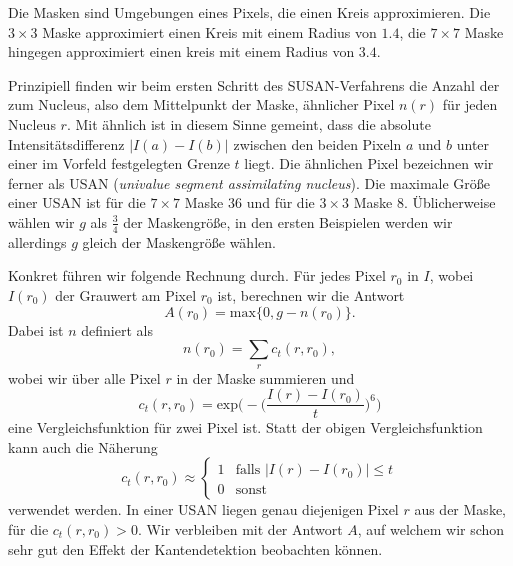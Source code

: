 \documentclass[a4paper, 11pt]{report}
\renewcommand{\emph}[1]{\textit{#1}}
\theoremstyle{definition}
\begin{document}
			Die Masken sind Umgebungen eines Pixels, die einen Kreis approximieren. Die $3 \times 3$ Maske approximiert einen Kreis mit einem Radius von $1.4$, die $7 \times 7$ Maske hingegen approximiert einen kreis mit einem Radius von $3.4$.

			Prinzipiell finden wir beim ersten Schritt des SUSAN-Verfahrens die Anzahl der zum Nucleus, also dem Mittelpunkt der Maske, ähnlicher Pixel $n(r)$ für jeden Nucleus $r$. Mit \glqq ähnlich\grqq{} ist in diesem Sinne gemeint, dass die absolute Intensitätsdifferenz $|I(a)-I(b)|$ zwischen den beiden Pixeln $a$ und $b$ unter einer im Vorfeld festgelegten Grenze $t$ liegt. Die ähnlichen Pixel bezeichnen wir ferner als USAN (\emph{univalue segment assimilating nucleus}). Die maximale Größe einer USAN ist für die $7 \times 7$ Maske $36$ und für die $3 \times 3$ Maske $8$. Üblicherweise wählen wir $g$ als $\frac{3}{4}$ der Maskengröße, in den ersten Beispielen werden wir allerdings $g$ gleich der Maskengröße wählen.

			Konkret führen wir folgende Rechnung durch.
			Für jedes Pixel $r_0$ in $I$, wobei $I(r_0)$ der Grauwert am Pixel $r_0$ ist, berechnen wir die Antwort
				$$A(r_0) = \text{max}\{0, g - n(r_0)\}.$$
			Dabei ist $n$ definiert als
				$$n(r_0) = \sum_r c_t(r, r_0),$$
			wobei wir über alle Pixel $r$ in der Maske summieren und	
				$$
					c_t(r, r_0) =
						\text{exp}\bigg(-\Big(\frac{I(r) - I(r_0)}{t}\Big)^6\bigg)
				$$
			eine Vergleichsfunktion für zwei Pixel ist. Statt der obigen Vergleichsfunktion kann auch die Näherung
				$$
					c_t(r, r_0) \approx
						\begin{cases}
							1 	& \text{falls } |I(r) - I(r_0)| \leq t 	\\
							0 	& \text{sonst}
						\end{cases}
				$$
			verwendet werden. In einer USAN liegen genau diejenigen Pixel $r$ aus der Maske, für die $c_t(r, r_0) > 0$. Wir verbleiben mit der Antwort $A$, auf welchem wir schon sehr gut den Effekt der Kantendetektion beobachten können.
\end{document}
